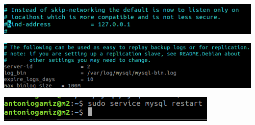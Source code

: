 \documentclass[12pt]{article}
\begin{document}
\medskip

\begin{center}

\includegraphics[scale=0.4]{14.png}

\includegraphics[scale=0.4]{15.png}

\includegraphics[scale=0.4]{16.png}

\end{center}
\end{document}
